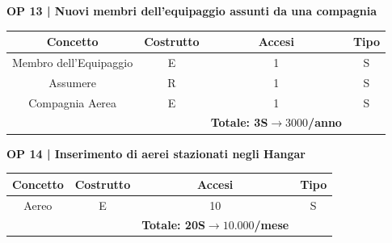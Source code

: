 \vspace{.6cm}


\textbf{\small OP 13 | Nuovi membri dell'equipaggio assunti da una compagnia}\\

\begin{tabular}{ c c c c} 
	\hline
	\rowcolor{airforceblue}
	\textbf{\color{white}Concetto} & \textbf{\color{white}Costrutto} & \textbf{\color{white}Accesi} & \textbf{\color{white}Tipo}\\
	\hline
	\textsf{\small Membro dell'Equipaggio} & \textsf{\small E} & \textsf{\small 1} &  \textsf{\small S}\\
	\hline
	\textsf{\small Assumere} & \textsf{\small R} & \textsf{\small 1} &  \textsf{\small S}\\
	\hline
	\textsf{\small Compagnia Aerea} & \textsf{\small E} & \textsf{\small 1} &  \textsf{\small S}\\
	\hline
	\rowcolor{airforceblue}
	\textsf{\small } & \textsf{\small } & \textbf{\color{white}Totale: 3S$\rightarrow 3000$/anno } \textsf{\small } & \textsf{\small }\\ %
	\hline
\end{tabular}

\vspace{.6cm}


\textbf{\small OP 14 | Inserimento di aerei stazionati negli Hangar}\\

\begin{tabular}{ c c c c}
	\hline
	\rowcolor{airforceblue}
	\textbf{\color{white}Concetto} & \textbf{\color{white}Costrutto} & \textbf{\color{white}Accesi} & \textbf{\color{white}Tipo}\\
	\hline
	\textsf{\small Aereo} & \textsf{\small E} & \textsf{\small 10} &  \textsf{\small S}\\
	\hline
	\rowcolor{airforceblue}
	\textsf{\small } & \textsf{\small } & \textbf{\color{white}Totale: 20S$\rightarrow 10.000$/mese } \textsf{\small } & \textsf{\small }\\ %
	\hline
\end{tabular}

